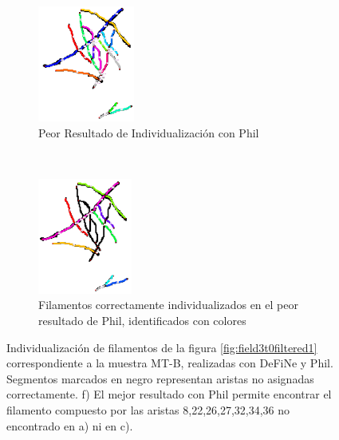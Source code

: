 \begin{figure}[h!]
    \begin{subfigure}[t]{0.49\textwidth}
        \centering
        \includegraphics[height=1.5in]{resultImages/field3-t0-2cellBcrop-filtered-phil-s10-v05-antLabeled.png}
        \caption{Peor Resultado de Individualizaci\'on con Phil}
        \label{field3t0filtered1Results-worstPhil}
    \end{subfigure}
    ~ 
    \begin{subfigure}[t]{0.49\textwidth}
        \centering
        \includegraphics[height=1.5in]{resultImages/field3-t0-2cellBcrop-filtered-phil-s10-v05-exactMatch-antLabeled.png}
        \caption{Filamentos correctamente individualizados en el peor resultado de Phil, identificados con colores}
        \label{field3t0filtered1Results-worstPhilExact}
    \end{subfigure}
    
    \caption{Individualizaci\'on  de filamentos de la figura \ref{fig:field3t0filtered1} correspondiente a la muestra MT-B, realizadas con DeFiNe y Phil. Segmentos marcados en negro representan aristas no asignadas correctamente. f) El mejor resultado con Phil permite encontrar el filamento compuesto por las aristas 8,22,26,27,32,34,36 no encontrado en a) ni en c). }
    \label{fig:field3t0filtered1Results}
\end{figure}

